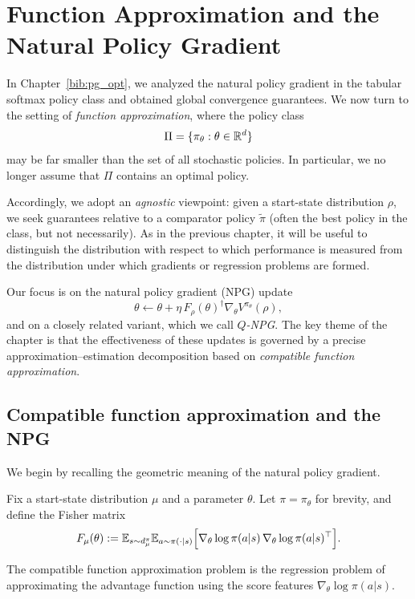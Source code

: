 \chapter{Function Approximation and the Natural Policy Gradient}
\label{chap:pg_approx}

In Chapter~\ref{bib:pg_opt}, we analyzed the natural policy gradient in the tabular softmax
policy class and obtained global convergence guarantees. We now turn to the setting of
\emph{function approximation}, where the policy class
\[
\Pi=\{\pi_\theta:\theta\in\mathbb{R}^d\}
\]
may be far smaller than the set of all stochastic policies. In particular, we no longer
assume that $\Pi$ contains an optimal policy.

Accordingly, we adopt an \emph{agnostic} viewpoint: given a start-state distribution
$\rho$, we seek guarantees relative to a comparator policy $\widetilde \pi$ (often the
best policy in the class, but not necessarily). As in the previous chapter, it will be
useful to distinguish the distribution with respect to which performance is measured from
the distribution under which gradients or regression problems are formed.

Our focus is on the natural policy gradient (NPG) update
\begin{equation}\label{eqn:vanilla_NPG}
\theta \leftarrow \theta + \eta\, F_\rho(\theta)^\dagger \nabla_\theta V^{\pi_\theta}(\rho),
\end{equation}
and on a closely related variant, which we call \emph{$Q$-NPG}. The key theme of the
chapter is that the effectiveness of these updates is governed by a precise
approximation--estimation decomposition based on \emph{compatible function approximation}.

\section{Compatible function approximation and the NPG}

We begin by recalling the geometric meaning of the natural policy gradient.

Fix a start-state distribution $\mu$ and a parameter $\theta$. Let $\pi=\pi_\theta$ for
brevity, and define the Fisher matrix
\[
F_\mu(\theta)
:=
\mathbb{E}_{s\sim d_\mu^\pi}
\mathbb{E}_{a\sim \pi(\cdot|s)}
\Big[
\nabla_\theta \log \pi(a|s)\,\nabla_\theta \log \pi(a|s)^\top
\Big].
\]

The compatible function approximation problem is the regression problem of approximating
the advantage function using the score features $\nabla_\theta \log \pi(a|s)$.

